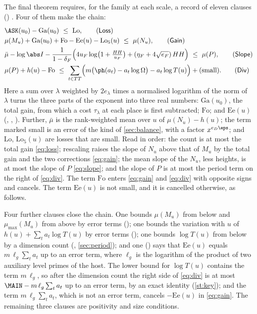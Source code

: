 The final theorem requires, for the family at each scale, a record of eleven clauses
(\textsubscript{}) \lvS. Four of them make the chain:
\begin{align}
&\ASK(u_0)-\mathrm{Ga}(u_0)\ \le\ \mathrm{Lo}, \tag{\textsf{Loss}}\label{eq:loss}\\
&\mu(M_u)+\mathrm{Ga}(u_0)+\mathrm{Fo}-\mathrm{Ee}(u)-\mathrm{Lo}_5(u)\ \le\ \mu(N_u),
   \tag{\textsf{Gain}}\label{eq:gain}\\
&\bar\mu-\log\abs I-\frac{1}{1-\delta_F}\Bigl(4u_F\log\bigl(1+\tfrac{HH}{u_F}\bigr)
     +(\eta_F+4\sqrt{e_F})\,HH\Bigr)\ \le\ \mu(P), \tag{\textsf{Slope}}\label{eq:slope}\\
&\mu(P)+h(u)-\mathrm{Fo}\ \le\ \sum_{t\in TT}\Bigl(m\bigl(\ph(a_t)-a_t\log\Omega\bigr)-a_t\log T(u)\Bigr)
     +(\text{small}). \tag{\textsf{Div}}\label{eq:div}
\end{align}
Here a sum over $\lambda$ weighted by $2e_\lambda$ times a normalised logarithm of the norm of
$\lambda$ turns the three parts of the exponent into three real numbers: $\mathrm{Ga}(u_0)$,
the total gain, from which a cost $\tau_\lambda$ at each place is first subtracted;
$\mathrm{Fo}$; and $\mathrm{Ee}(u)$ (, , ). Further, $\bar\mu$ is the
rank-weighted mean over $u$ of $\mu(N_u)-h(u)$; the term marked small is an error of the kind
of \cref{sec:balance}, with a factor $x^{e_D\eps}$; and $\mathrm{Lo}$, $\mathrm{Lo}_5(u)$ are
losses that are small. Read in order: the count is at most the total gain \eqref{eq:loss};
rescaling raises the slope of $N_u$ above that of $M_u$ by the total gain and the two
corrections \eqref{eq:gain}; the mean slope of the $N_u$, less heights, is at most the slope
of $P$ \eqref{eq:slope}; and the slope of $P$ is at most the period term on the right of
\eqref{eq:div}. The term $\mathrm{Fo}$ enters \eqref{eq:gain} and \eqref{eq:div} with opposite
signs and cancels. The term $\mathrm{Ee}(u)$ is not small, and it is cancelled otherwise, as
follows.

Four further clauses close the chain. One bounds $\mu(M_u)$ from below and
$\mu_{\max}(M_u)$ from above by error terms (); one bounds the variation with $u$
of $h(u)+\sum_ta_t\log T(u)$ by error terms (); one bounds $\log T(u)$ from
below by a dimension count (, \cref{sec:period}); and one () says
that $\mathrm{Ee}(u)$ equals $m\,\ell_g\sum_ta_t$ up to an error term, where
$\ell_g$ is the logarithm of the product of two auxiliary level primes of the host. The lower bound
for $\log T(u)$ contains the term $m\,\ell_g$, so after the dimension count the right side of
\eqref{eq:div} is at most $\MAIN-m\,\ell_g\sum_ta_t$ up to an error term, by an exact identity
(\cref{st:key}); and the term $m\,\ell_g\sum_ta_t$, which is not an error term,
cancels $-\mathrm{Ee}(u)$ in \eqref{eq:gain}. The remaining three clauses are positivity and
size conditions.

